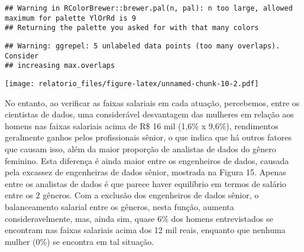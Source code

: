 \documentclass[
]{article}
\begin{document}
\begin{verbatim}
## Warning in RColorBrewer::brewer.pal(n, pal): n too large, allowed maximum for palette YlOrRd is 9
## Returning the palette you asked for with that many colors
\end{verbatim}

\begin{verbatim}
## Warning: ggrepel: 5 unlabeled data points (too many overlaps). Consider
## increasing max.overlaps
\end{verbatim}

\texttt{[image: relatorio\_files/figure-latex/unnamed-chunk-10-2.pdf]}

No entanto, ao verificar as faixas salariais em cada atuação,
percebemos, entre os cientistas de dados, uma considerável desvantagem
das mulheres em relação aos homens nas faixas salariais acima de R\$ 16
mil (1,6\% x 9,6\%), rendimentos geralmente ganhos pelos profissionais
sênior, o que indica que há outros fatores que causam isso, além da
maior proporção de analistas de dados do gênero feminino. Esta diferença
é ainda maior entre os engenheiros de dados, causada pela excassez de
engenheiras de dados sênior, mostrada na Figura 15. Apenas entre os
analistas de dados é que parece haver equilíbrio em termos de salário
entre os 2 gêneros. Com a exclusão dos engenheiros de dados sênior, o
balanceamento salarial entre os gêneros, nesta função, aumenta
consideravelmente, mas, ainda sim, quase 6\% dos homens entrevistados se
encontram nas faixas salariais acima dos 12 mil reais, enquanto que
nenhuma mulher (0\%) se encontra em tal situação.
\end{document}
